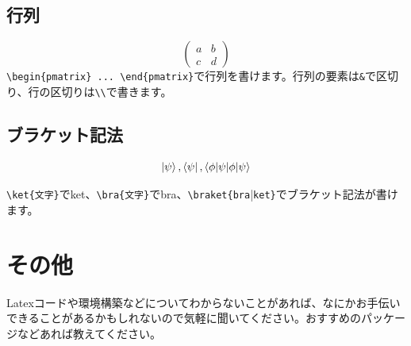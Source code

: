 \documentclass[paper=a4, fontsize=10pt]{jlreq}
\begin{document}
\subsection{行列}
\begin{equation*}
    \begin{pmatrix}
        a & b \\
        c & d
    \end{pmatrix}
\end{equation*}
\verb|\begin{pmatrix} ... \end{pmatrix}|で行列を書けます。行列の要素は\verb|&|で区切り、行の区切りは\verb|\\|で書きます。
\subsection{ブラケット記法}
\begin{equation*}
    \ket{\psi}, \bra{\psi}, \braket{\phi|\psi}
\end{equation*}

\verb|\ket{文字}|でket、\verb|\bra{文字}|でbra、\verb|\braket{bra||\verb|ket}|でブラケット記法が書けます。
\section{その他}
Latexコードや環境構築などについてわからないことがあれば、なにかお手伝いできることがあるかもしれないので気軽に聞いてください。おすすめのパッケージなどあれば教えてください。
\end{document}

